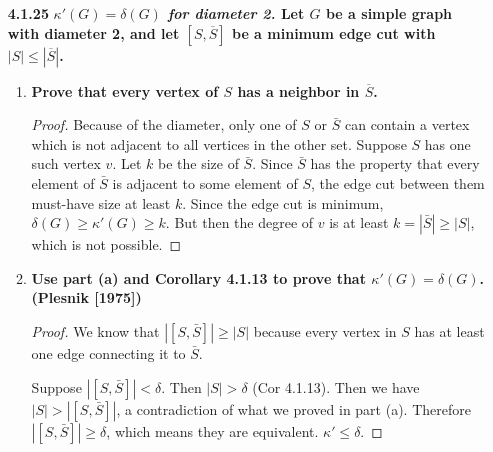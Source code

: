 \documentclass[11pt]{amsart}
\theoremstyle{plain}
\theoremstyle{definition}
\theoremstyle{example}
\begin{document}
\begin{enumerate}[\qquad]
\begin{proof}Let $x,y$ be any two non-adjacent vertices. Fix $k$ such that $k\leq 2\delta +2-n$. Then $\delta \geq (n+k-2)/2$,  and $|N(x)|, |N(y)| \geq \delta \geq (n+k-2)/2$. Also, $|N(x)\cup N(y)| \leq n-2$.

\begin{align*} |N(x)\cap N(y)| &  = |N(x)| + |N(y)| - |N(x)\cup N(y)| \\
& \geq (n+k-2)/2 + (n+k-2)/2 - (n-2) \\
& = k\end{align*}

Since $x,y$ were arbitrary, this means that for any pair of vertices, any set of fewer than $k$ vertices cannot disconnect them.


\end{proof}

\bigskip




\item[\bf 4.1.25] {\bf \textit{$\kappa'(G) = \delta(G)$ for diameter 2.}  Let $G$ be a simple graph with diameter 2, and let $[S,\overline{S}]$ be a minimum edge cut with $|S|\leq |\overline{S}|$.}\\

\begin{enumerate}[\bf (a)]
\item  {\bf Prove that every vertex of $S$ has a neighbor in $\overline{S}$.}

\begin{proof}
Because of the diameter, only one of $S$ or $\bar S$ can contain a vertex which is not adjacent to all vertices in the other set. Suppose $S$ has one such vertex $v$. Let $k$ be the size of $\bar S$. Since $\bar S$ has the property that every element of $\bar S$ is adjacent to some element of $S$, the edge cut between them must-have size at least $k$. Since the edge cut is minimum, $\delta(G) \geq \kappa'(G) \geq k$. But then the degree of $v$ is at least $k = |\bar S| \geq |S|$, which is not possible.
\end{proof}

\item  {\bf Use part (a) and Corollary 4.1.13 to prove that $\kappa'(G) = \delta(G)$. (Plesnik [1975])}
\begin{proof}

We know that $|[S,\bar{S}]| \geq |S|$ because every vertex in $S$ has at least one edge connecting it to $\bar{S}$.

Suppose $|[S,\bar{S}]| < \delta$. Then $|S| > \delta$ (Cor 4.1.13). Then we have $|S| > |[S,\bar{S}]|$, a contradiction of what we proved in part (a). Therefore $|[S,\bar{S}]| \geq \delta$, which means they are equivalent. $\kappa' \leq \delta$.



\end{proof}
\end{enumerate}
\end{enumerate}
\end{document}
